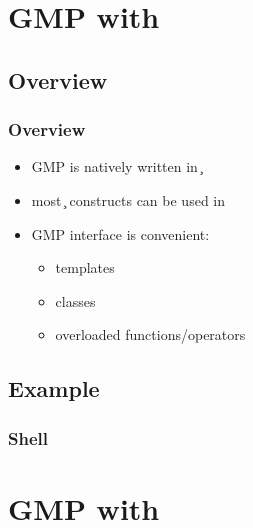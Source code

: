 \section{GMP with \cpp}

\subsection{Overview}

\begin{frame}
\frametitle{Overview}
\begin{itemize}
\item GMP is natively written in \c
\item most \c{} constructs can be used in \cpp
\item GMP \cpp{} interface is convenient:
  \begin{itemize}
  \item templates
  \item classes
  \item overloaded functions/operators
  \end{itemize}
\end{itemize}
\end{frame}

\subsection{Example}

\begin{frame}
\frametitle{}

\end{frame}

\begin{frame}
\frametitle{}

\end{frame}

\begin{frame}
\frametitle{}

\end{frame}

\begin{frame}
\frametitle{Shell}

\end{frame}


\section{GMP with \make}

